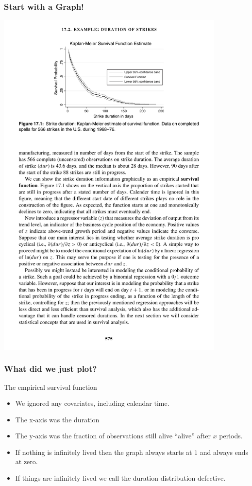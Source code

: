 \documentclass[xcolor=pdftex,dvipsnames,table,mathserif]{beamer}
\begin{document}
\begin{frame}
\frametitle{Start with a Graph!}
\begin{center}
\includegraphics[width=4.5in]{./resources/figure17-1.pdf}
\end{center}
\end{frame}

\begin{frame}
\frametitle{What did we just plot?}
The \alert{empirical survival function}
\begin{itemize}
\item We ignored any covariates, including calendar time.
\item The x-axis was the duration
\item The y-axis was the fraction of observations still alive ``alive'' after $x$ periods.
\item If nothing is infinitely lived then the graph always starts at $1$ and always ends at zero.
\item If things are infinitely lived we call the duration distribution \alert{defective}.
\end{itemize}
\end{frame}
\end{document}
